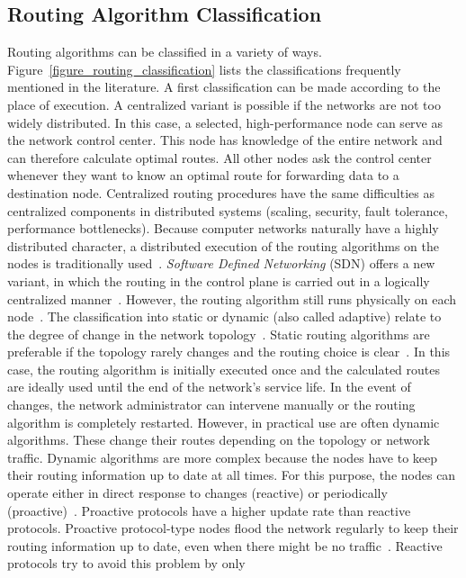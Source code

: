 \documentclass[english,version-2019-11]{uzl-thesis}
\begin{document}
\subsection{Routing Algorithm Classification}
Routing algorithms can be classified in a variety of ways.
Figure~\ref{figure_routing_classification} lists the classifications frequently
mentioned in the literature.
A first classification can be made according
to the place of execution. A centralized variant is possible
if the networks are not too widely distributed.
In this case, a selected, high-performance node can serve
as the network control center. This node has knowledge
of the entire network and can therefore calculate optimal
routes. All other nodes ask the control center whenever
they want to know an optimal route for forwarding data
to a destination node. Centralized routing procedures have
the same difficulties as centralized components
in distributed systems (scaling, security,
fault tolerance, performance bottlenecks).
Because computer networks naturally have a highly
distributed character, a distributed execution
of the routing algorithms on the nodes is traditionally
used~\cite{Kurose}. \emph{Software Defined Networking} (SDN) offers a new variant,
in which the routing in the control plane is carried
out in a logically centralized manner~\cite{Kurose}.
However, the routing algorithm still runs physically on each node~\cite{Kurose}.
The classification into static or dynamic (also called adaptive)
relate to the degree of change in the network topology~\cite{Tanenbaum}.
Static routing algorithms are preferable if the topology
rarely changes and the routing choice is clear~\cite{Tanenbaum}.
In this case, the routing algorithm is initially
executed once and the calculated routes are ideally used until
the end of the network's service life.
In the event of changes, the network administrator
can intervene manually or the routing algorithm is
completely restarted. However, in practical use are often dynamic algorithms.
These change their routes
depending on the topology or network traffic. Dynamic
algorithms are more complex because the nodes have to
keep their routing information up to date at all times.
For this purpose, the nodes can operate either
in direct response to changes (reactive) or
periodically (proactive)~\cite{Schiller}.
Proactive protocols have a higher update rate than
reactive protocols. Proactive protocol-type nodes flood
the network regularly to keep their routing information
up to date, even when there might be no traffic~\cite{Schiller}.
Reactive protocols try to avoid this problem by only
\end{document}
